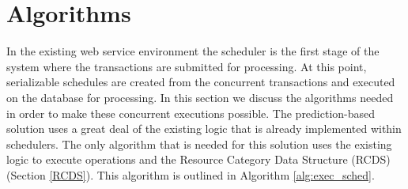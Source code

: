 \documentclass[conference]{IEEEtran}
\begin{document}

\section{Algorithms}
\label{sec:algorithms}
In the existing web service environment the scheduler is the first stage of the system where the transactions are submitted for processing. At this point, serializable schedules are created from the concurrent transactions and executed on the database for processing. In this section we discuss the algorithms needed in order to make these concurrent executions possible. The prediction-based solution uses a great deal of the existing logic that is already implemented within schedulers. The only algorithm that is needed for this solution uses the existing logic to execute operations and the Resource Category Data Structure (RCDS) (Section \ref{RCDS}). This algorithm is outlined in Algorithm \ref{alg:exec_sched}.

\end{document}
